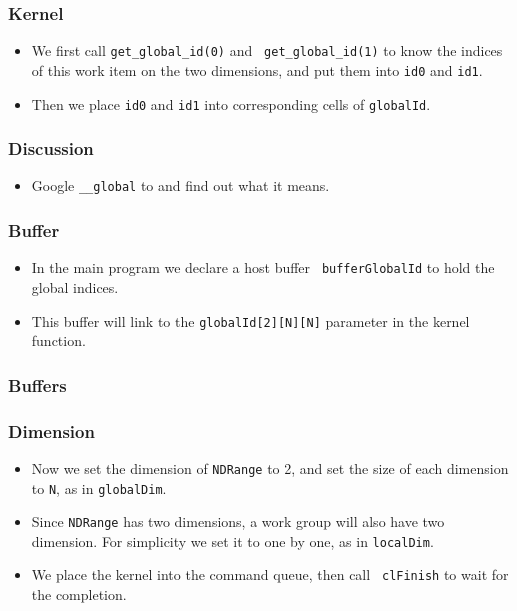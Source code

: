 \documentclass{beamer}
\begin{document}
\begin{frame}
  \frametitle{Kernel}
  \begin{itemize}
  \item We first call {\tt get\_global\_id(0)} and {\tt
    get\_global\_id(1)} to know the indices of this work item on the
    two dimensions, and put them into {\tt id0} and {\tt id1}.
  \item Then we place {\tt id0} and {\tt id1} into corresponding
        cells of {\tt globalId}.
  \end{itemize}
\end{frame}

\begin{frame}
  \frametitle{Discussion}
  \begin{itemize}
    \item Google {\tt \_\_global} to and find out what it means.
  \end{itemize}
\end{frame}

\begin{frame}
  \frametitle{Buffer}
  \begin{itemize}
    \item In the main program we declare a host buffer {\tt
      bufferGlobalId} to hold the global indices.
    \item This buffer will link to the {\tt globalId[2][N][N]}
      parameter in the kernel function.
  \end{itemize}
\end{frame}

\begin{frame}
  \frametitle{Buffers}
\end{frame}

\begin{frame}
  \frametitle{Dimension}
  \begin{itemize}
    \item Now we set the dimension of {\tt NDRange} to 2, and set the
      size of each dimension to {\tt N}, as in {\tt globalDim}.
    \item Since {\tt NDRange} has two dimensions, a work group will
      also have two dimension.  For simplicity we set it to one by
      one, as in {\tt localDim}. 
      \item We place the kernel into the command queue, then call {\tt
        clFinish} to wait for the completion.
  \end{itemize}
\end{frame}
\end{document}
